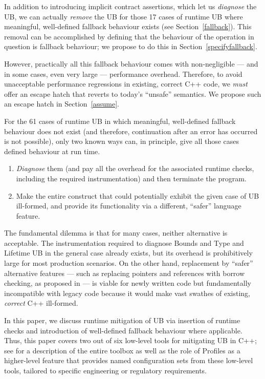 In addition to introducing implicit contract assertions, which let us \emph{diagnose} the UB, we can actually \emph{remove} the UB for those 17 cases of runtime UB where meaningful, well-defined fallback behaviour exists (see Section~\ref{fallback}). This removal can be accomplished by defining that the behaviour of the operation in question is fallback behaviour; we propose to do this in Section~\ref{specifyfallback}.

However, practically all this fallback behaviour comes with non-negligible --- and in some cases, even very large --- performance overhead. Therefore, to avoid unacceptable performance regressions in existing, correct C++ code, we \emph{must} offer an escape hatch that reverts to today's ``unsafe'' semantics. We propose such an escape hatch in Section~\ref{assume}.

For the 61 cases of runtime UB in which meaningful, well-defined fallback behaviour does not exist (and therefore, continuation after an error has occurred is not possible), only two known ways can, in principle, give all those cases defined behaviour at run time.
\begin{enumerate}
\renewcommand{\labelenumi}{\arabic{enumi}.}
\item \emph{Diagnose} them (and pay all the overhead for the associated runtime checks, including the required instrumentation) and then terminate the program.
\item Make the entire construct that could potentially exhibit the given case of UB ill-formed, and provide its functionality via a different, ``safer'' language feature.
\end{enumerate}

The fundamental dilemma is that for many cases, neither alternative is acceptable. The instrumentation required to diagnose Bounds and Type and Lifetime UB in the general case already exists, but its overhead is prohibitively large for most production scenarios. On the other hand, replacement by ``safer'' alternative features --- such as replacing pointers and references with borrow checking, as proposed in \cite{P3390R0} --- is viable for newly written code but fundamentally incompatible with legacy code because it would make vast swathes of existing, \emph{correct} C++ ill-formed.

In this paper, we discuss runtime mitigation of UB via insertion of runtime checks and introduction of well-defined fallback behaviour where applicable. Thus, this paper covers two out of six low-level tools for mitigating UB in C++; see \cite{P3756R0} %
for a description of the entire toolbox as well as the role of Profiles as a higher-level feature that provides named configuration sets from these low-level tools, tailored to specific engineering or regulatory requirements.

